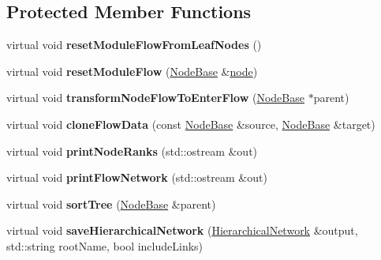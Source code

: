 \subsection*{Protected Member Functions}
\begin{DoxyCompactItemize}
\item 
\mbox{\label{classInfomapGreedy_a13210b106c999a0df0e4be8d72347d7a}} 
virtual void {\bfseries reset\+Module\+Flow\+From\+Leaf\+Nodes} ()
\item 
\mbox{\label{classInfomapGreedy_addb5f63b9ea785dd1dea78af55cc4511}} 
virtual void {\bfseries reset\+Module\+Flow} (\mbox{\hyperlink{classNodeBase}{Node\+Base}} \&\mbox{\hyperlink{structnode}{node}})
\item 
\mbox{\label{classInfomapGreedy_adcc7d7b67a24a4637fa79c12a7e86a13}} 
virtual void {\bfseries transform\+Node\+Flow\+To\+Enter\+Flow} (\mbox{\hyperlink{classNodeBase}{Node\+Base}} $\ast$parent)
\item 
\mbox{\label{classInfomapGreedy_a419dc025fd69b4db6f1ed6822fb4c7d3}} 
virtual void {\bfseries clone\+Flow\+Data} (const \mbox{\hyperlink{classNodeBase}{Node\+Base}} \&source, \mbox{\hyperlink{classNodeBase}{Node\+Base}} \&target)
\item 
\mbox{\label{classInfomapGreedy_ac48438b67647ba0985ed96e41c3bddcf}} 
virtual void {\bfseries print\+Node\+Ranks} (std\+::ostream \&out)
\item 
\mbox{\label{classInfomapGreedy_a0b30c388daeaa1cc33f35143ab4cb7fb}} 
virtual void {\bfseries print\+Flow\+Network} (std\+::ostream \&out)
\item 
\mbox{\label{classInfomapGreedy_a2469202878f49deb588c5f59eac32035}} 
virtual void {\bfseries sort\+Tree} (\mbox{\hyperlink{classNodeBase}{Node\+Base}} \&parent)
\item 
\mbox{\label{classInfomapGreedy_aa523c48982fe29a2ed56a277066a1a4d}} 
virtual void {\bfseries save\+Hierarchical\+Network} (\mbox{\hyperlink{classHierarchicalNetwork}{Hierarchical\+Network}} \&output, std\+::string root\+Name, bool include\+Links)

\end{DoxyCompactItemize}
